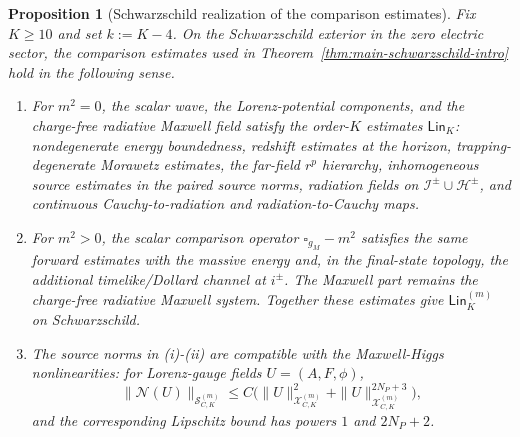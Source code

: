 \documentclass[11pt]{article}
\numberwithin{equation}{section}
\theoremstyle{plain}
\newtheorem{proposition}[theorem]{Proposition}
\theoremstyle{definition}
\theoremstyle{remark}
\newcommand{\Lin}{\mathsf{Lin}}
\begin{document}
\begin{proposition}[Schwarzschild realization of the comparison estimates]\label{prop:schwarzschild-linear-package}
Fix $K\ge10$ and set $k:=K-4$.  On the Schwarzschild exterior in the zero electric sector, the comparison estimates used in Theorem~\ref{thm:main-schwarzschild-intro} hold in the following sense.
\begin{enumerate}
\item[(i)] For $m^2=0$, the scalar wave, the Lorenz-potential components, and the charge-free radiative Maxwell field satisfy the order-$K$ estimates $\Lin_K$: nondegenerate energy boundedness, redshift estimates at the horizon, trapping-degenerate Morawetz estimates, the far-field $r^p$ hierarchy, inhomogeneous source estimates in the paired source norms, radiation fields on $\mathcal I^\pm\cup\mathcal H^\pm$, and continuous Cauchy-to-radiation and radiation-to-Cauchy maps.
\item[(ii)] For $m^2>0$, the scalar comparison operator $\square_{g_M}-m^2$ satisfies the same forward estimates with the massive energy and, in the final-state topology, the additional timelike/Dollard channel at $i^\pm$.  The Maxwell part remains the charge-free radiative Maxwell system.  Together these estimates give $\Lin_K^{(m)}$ on Schwarzschild.
\item[(iii)] The source norms in (i)-(ii) are compatible with the Maxwell-Higgs nonlinearities: for Lorenz-gauge fields $U=(A,F,\phi)$,
\begin{equation}
 \|\mathcal N(U)\|_{\mathcal S^{(m)}_{C,K}}
 \le C\bigl(\|U\|_{\mathcal X^{(m)}_{C,K}}^2+
 \|U\|_{\mathcal X^{(m)}_{C,K}}^{2N_P+3}\bigr),
\end{equation}
and the corresponding Lipschitz bound has powers $1$ and $2N_P+2$.
\end{enumerate}
\end{proposition}
\end{document}
